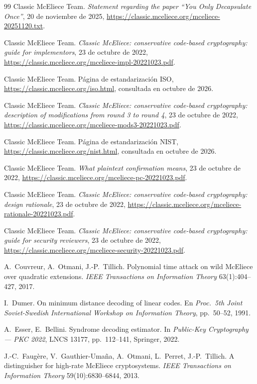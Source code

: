 \begin{thebibliography}{99}
Classic McEliece Team. \emph{Statement regarding the paper ``You Only
Decapsulate Once''}, 20 de noviembre de 2025,
\url{https://classic.mceliece.org/mceliece-20251120.txt}.

Classic McEliece Team. \emph{Classic McEliece: conservative
code-based cryptography: guide for implementors}, 23 de octubre de
2022,
\url{https://classic.mceliece.org/mceliece-impl-20221023.pdf}.

Classic McEliece Team. P\'agina de estandarizaci\'on ISO,
\url{https://classic.mceliece.org/iso.html}, consultada en octubre de
2026.

Classic McEliece Team. \emph{Classic McEliece: conservative
code-based cryptography: description of modifications from round 3
to round 4}, 23 de octubre de 2022,
\url{https://classic.mceliece.org/mceliece-mods3-20221023.pdf}.

Classic McEliece Team. P\'agina de estandarizaci\'on NIST,
\url{https://classic.mceliece.org/nist.html}, consultada en octubre de
2026.

Classic McEliece Team. \emph{What plaintext confirmation means},
23 de octubre de 2022,
\url{https://classic.mceliece.org/mceliece-pc-20221023.pdf}.

Classic McEliece Team. \emph{Classic McEliece: conservative
code-based cryptography: design rationale}, 23 de octubre de 2022,
\url{https://classic.mceliece.org/mceliece-rationale-20221023.pdf}.

Classic McEliece Team. \emph{Classic McEliece: conservative
code-based cryptography: guide for security reviewers}, 23 de
octubre de 2022,
\url{https://classic.mceliece.org/mceliece-security-20221023.pdf}.

A.~Couvreur, A.~Otmani, J.-P.~Tillich. Polynomial time attack on
wild McEliece over quadratic extensions. \emph{IEEE Transactions on
Information Theory} 63(1):404--427, 2017.

I.~Dumer. On minimum distance decoding of linear codes. En
\emph{Proc.\ 5th Joint Soviet-Swedish International Workshop on
Information Theory}, pp.~50--52, 1991.

A.~Esser, E.~Bellini. Syndrome decoding estimator. In
\emph{Public-Key Cryptography --- PKC 2022}, LNCS 13177,
pp.~112--141, Springer, 2022.

J.-C.~Faug\`ere, V.~Gauthier-Uma\~na, A.~Otmani, L.~Perret,
J.-P.~Tillich. A distinguisher for high-rate McEliece cryptosystems.
\emph{IEEE Transactions on Information Theory} 59(10):6830--6844,
2013.


\end{thebibliography}
